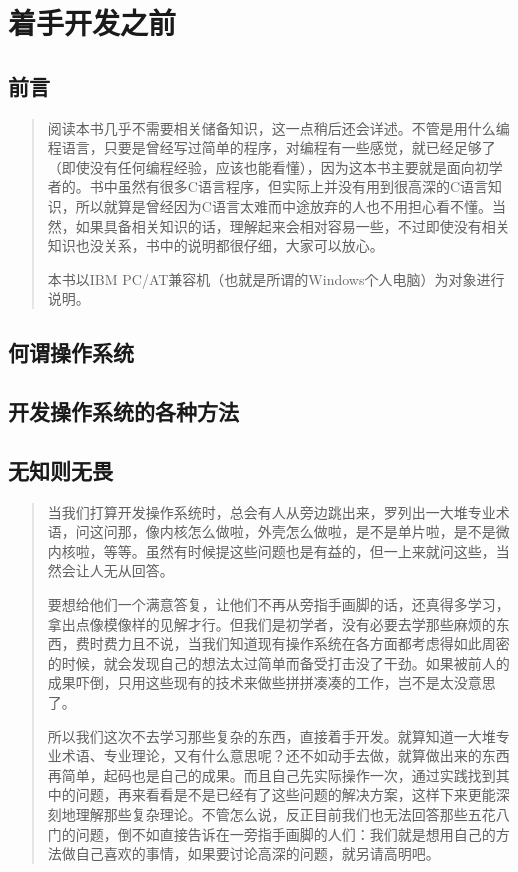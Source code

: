 ﻿\chapter{着手开发之前}

\section{	前言	}
\begin{quote}
阅读本书几乎不需要相关储备知识，这一点稍后还会详述。不管是用什么编程语言，只要是曾经写过简单的程序，对编程有一些感觉，就已经足够了（即使没有任何编程经验，应该也能看懂），因为这本书主要就是面向初学者的。书中虽然有很多C语言程序，但实际上并没有用到很高深的C语言知识，所以就算是曾经因为C语言太难而中途放弃的人也不用担心看不懂。当然，如果具备相关知识的话，理解起来会相对容易一些，不过即使没有相关知识也没关系，书中的说明都很仔细，大家可以放心。

本书以IBM PC/AT兼容机（也就是所谓的Windows个人电脑）为对象进行说明。
\end{quote}

\section{	何谓操作系统	}
\section{	开发操作系统的各种方法	}
\section{	无知则无畏	}

\begin{quote}
当我们打算开发操作系统时，总会有人从旁边跳出来，罗列出一大堆专业术语，问这问那，像内核怎么做啦，外壳怎么做啦，是不是单片啦，是不是微内核啦，等等。虽然有时候提这些问题也是有益的，但一上来就问这些，当然会让人无从回答。

要想给他们一个满意答复，让他们不再从旁指手画脚的话，还真得多学习，拿出点像模像样的见解才行。但我们是初学者，没有必要去学那些麻烦的东西，费时费力且不说，当我们知道现有操作系统在各方面都考虑得如此周密的时候，就会发现自己的想法太过简单而备受打击没了干劲。如果被前人的成果吓倒，只用这些现有的技术来做些拼拼凑凑的工作，岂不是太没意思了。

所以我们这次不去学习那些复杂的东西，直接着手开发。就算知道一大堆专业术语、专业理论，又有什么意思呢？还不如动手去做，就算做出来的东西再简单，起码也是自己的成果。而且自己先实际操作一次，通过实践找到其中的问题，再来看看是不是已经有了这些问题的解决方案，这样下来更能深刻地理解那些复杂理论。不管怎么说，反正目前我们也无法回答那些五花八门的问题，倒不如直接告诉在一旁指手画脚的人们：我们就是想用自己的方法做自己喜欢的事情，如果要讨论高深的问题，就另请高明吧。
\end{quote}

